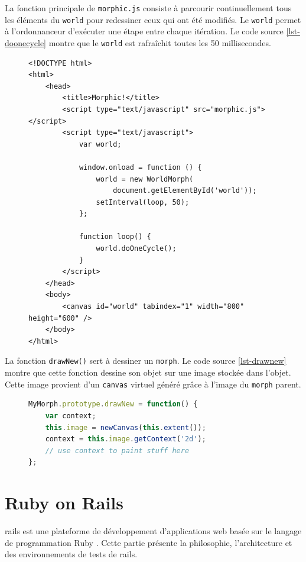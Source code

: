 La fonction principale de \texttt{morphic.js} consiste à parcourir continuellement tous les éléments du \texttt{world} pour redessiner ceux qui ont été modifiés. Le \texttt{world} permet à l'ordonnanceur d'exécuter une étape entre chaque itération. Le code source \ref{lst-doonecycle} montre que le \texttt{world} est rafraîchit toutes les 50 millisecondes.
\begin{figure}
\begin{lstlisting}[caption={Exemple d'utilisation de \texttt{morphic.js}},label=lst-doonecycle,language=HTML5,alsolanguage=JavaScript]
<!DOCTYPE html>
<html>
    <head>
        <title>Morphic!</title>
        <script type="text/javascript" src="morphic.js"></script>
        <script type="text/javascript">
            var world;

            window.onload = function () {
                world = new WorldMorph(
                    document.getElementById('world'));
                setInterval(loop, 50);
            };

            function loop() {
                world.doOneCycle();
            }
        </script>
    </head>
    <body>
        <canvas id="world" tabindex="1" width="800" height="600" />
    </body>
</html>
\end{lstlisting}
\end{figure}
La fonction \texttt{drawNew()} sert à dessiner un \texttt{morph}. Le code source \ref{lst-drawnew} montre que cette fonction dessine son objet sur une image stockée dans l'objet. Cette image provient d'un \texttt{canvas} virtuel généré grâce à l'image du \texttt{morph} parent.

\begin{figure}
\begin{lstlisting}[caption={Modèle pour la fonction \texttt{drawNew()}},label=lst-drawnew,language=JavaScript]
MyMorph.prototype.drawNew = function() {
    var context;
    this.image = newCanvas(this.extent());
    context = this.image.getContext('2d');
    // use context to paint stuff here
};
\end{lstlisting}
\end{figure}

\section{Ruby on Rails}
\label{rails}
\gls{rails} \cite{rails} est une plateforme de développement d'applications web basée sur le langage de programmation Ruby \cite{ruby}. Cette partie présente la philosophie, l'architecture et des environnements de tests de \gls{rails}.

